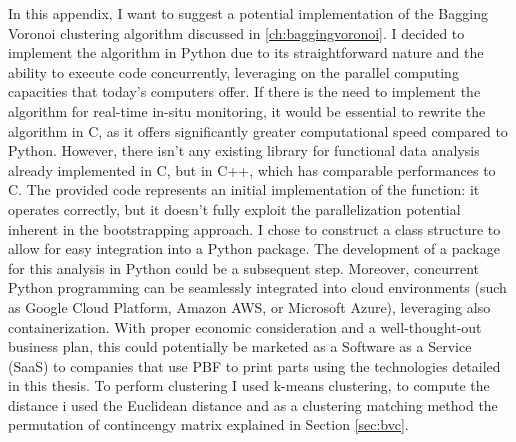 In this appendix, I want to suggest a potential implementation of the Bagging Voronoi clustering algorithm discussed in \ref{ch:baggingvoronoi}. I decided to implement the algorithm in Python due to its straightforward nature and the ability to execute code concurrently, leveraging on the parallel computing capacities that today's computers offer. If there is the need to implement the algorithm for real-time in-situ monitoring, it would be essential to rewrite the algorithm in C, as it offers significantly greater computational speed compared to Python. However, there isn't any existing library for functional data analysis already implemented in C, but in C++, which has comparable performances to C. The provided code represents an initial implementation of the function: it operates correctly, but it doesn't fully exploit the parallelization potential inherent in the bootstrapping approach. I chose to construct a class structure to allow for easy integration into a Python package. The development of a package for this analysis in Python could be a subsequent step. Moreover, concurrent Python programming can be seamlessly integrated into cloud environments (such as Google Cloud Platform, Amazon AWS, or Microsoft Azure), leveraging also containerization. With proper economic consideration and a well-thought-out business plan, this could potentially be marketed as a Software as a Service (SaaS) to companies that use PBF to print parts using the technologies detailed in this thesis. To perform clustering I used k-means clustering, to compute the distance i used the Euclidean distance and as a clustering matching method the permutation of contincengy matrix explained in Section \ref{sec:bvc}.

